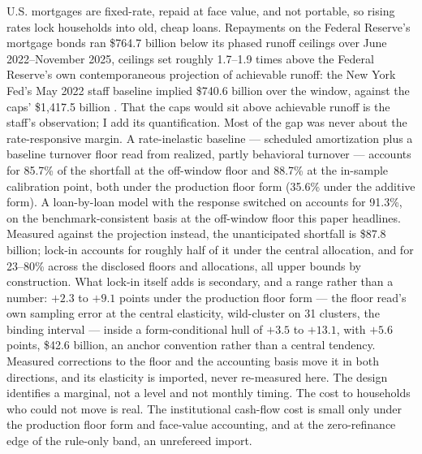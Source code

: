 \noindent U.S. mortgages are fixed-rate, repaid at face value, and not portable, so rising rates lock households into old, cheap loans. Repayments on the Federal Reserve's mortgage bonds ran \$764.7 billion below its phased runoff ceilings over June 2022--November 2025, ceilings set roughly 1.7--1.9 times above the Federal Reserve's own contemporaneous projection of achievable runoff: the New York Fed's May 2022 staff baseline implied \$740.6 billion over the window, against the caps' \$1{,}417.5 billion \citep{nyfed2022}. That the caps would sit above achievable runoff is the staff's observation; I add its quantification. Most of the gap was never about the rate-responsive margin. A rate-inelastic baseline --- scheduled amortization plus a baseline turnover floor read from realized, partly behavioral turnover --- accounts for 85.7\% of the shortfall at the off-window floor and 88.7\% at the in-sample calibration point, both under the production floor form (35.6\% under the additive form). A loan-by-loan model with the response switched on accounts for 91.3\%, on the benchmark-consistent basis at the off-window floor this paper headlines. Measured against the projection instead, the unanticipated shortfall is \$87.8 billion; lock-in accounts for roughly half of it under the central allocation, and for 23--80\% across the disclosed floors and allocations, all upper bounds by construction. What lock-in itself adds is secondary, and a range rather than a number: $+2.3$ to $+9.1$ points under the production floor form --- the floor read's own sampling error at the central elasticity, wild-cluster on 31 clusters, the binding interval --- inside a form-conditional hull of $+3.5$ to $+13.1$, with $+5.6$ points, \$42.6 billion, an anchor convention rather than a central tendency. Measured corrections to the floor and the accounting basis move it in both directions, and its elasticity is imported, never re-measured here. The design identifies a marginal, not a level and not monthly timing. The cost to households who could not move is real. The institutional cash-flow cost is small only under the production floor form and face-value accounting, and at the zero-refinance edge of the rule-only band, an unrefereed import.
